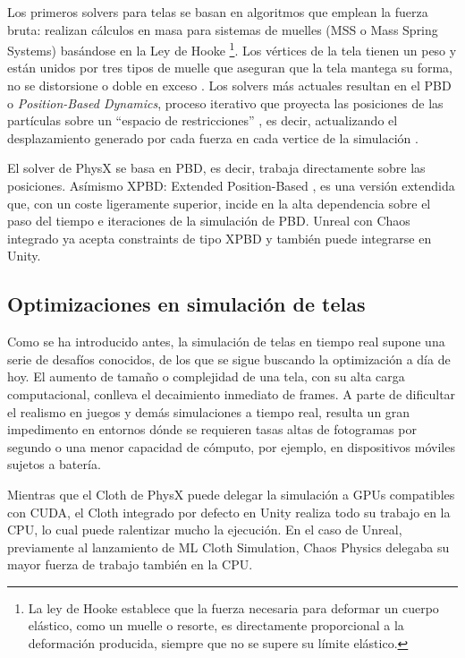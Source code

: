 Los primeros solvers para telas se basan en algoritmos que emplean la fuerza bruta: realizan cálculos en masa para sistemas de muelles (MSS o Mass Spring Systems) basándose en la Ley de Hooke \footnote{La ley de Hooke establece que la fuerza necesaria para deformar un cuerpo elástico, como un muelle o resorte, es directamente proporcional a la deformación producida, siempre que no se supere su límite elástico. }. Los vértices de la tela tienen un peso y están unidos por tres tipos de muelle que aseguran que la tela mantega su forma, no se distorsione o doble en exceso \cite{provot1995deformation}. Los solvers más actuales resultan en el PBD o \textit{Position-Based Dynamics}, proceso iterativo que proyecta las posiciones de las partículas sobre un ``espacio de restricciones'' \cite{muller_position_2007}, es decir, actualizando el desplazamiento generado por cada fuerza en cada vertice de la simulación \cite{chaudhary2025towards}.\newline

El solver de PhysX se basa en PBD, es decir, trabaja directamente sobre las posiciones. Asímismo XPBD: Extended Position-Based \cite{macklin_xpbd_2016}, es una versión extendida que, con un coste ligeramente superior, incide en la alta dependencia sobre el paso del tiempo e iteraciones de la simulación de PBD. Unreal con Chaos integrado ya acepta constraints de tipo XPBD y también puede integrarse en Unity.


\subsection{Optimizaciones en simulación de telas}
\label{subsec:optimtelas}
Como se ha introducido antes, la simulación de telas en tiempo real supone una serie de desafíos conocidos, de los que se sigue buscando la optimización a día de hoy. El aumento de tamaño o complejidad de una tela, con su alta carga computacional, conlleva el decaimiento inmediato de frames. A parte de dificultar el realismo en juegos y demás simulaciones a tiempo real, resulta un gran impedimento en entornos dónde se requieren tasas altas de fotogramas por segundo o una menor capacidad de cómputo, por ejemplo, en dispositivos móviles sujetos a batería.\newline

Mientras que el Cloth de PhysX puede delegar la simulación a GPUs compatibles con CUDA, el Cloth integrado por defecto en Unity realiza todo su trabajo en la CPU, lo cual puede ralentizar mucho la ejecución. En el caso de Unreal, previamente al lanzamiento de ML Cloth Simulation, Chaos Physics delegaba su mayor fuerza de trabajo también en la CPU. \newline

